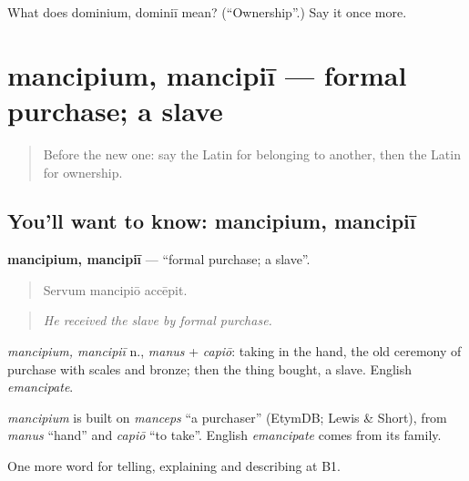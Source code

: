 \begin{tcolorbox}[breakable,colback=teal!4,colframe=teal!35!black,title={Before you move on}]
What does dominium, dominiī mean? (\textquotedblleft{}Ownership\textquotedblright{}.) Say it once more.
\end{tcolorbox}
\section[mancipium, mancipiī]{mancipium, mancipiī — formal purchase; a slave}

\label{lesson:LA-C417-mancipium}



\begin{quote}
Before the new one: say the Latin for belonging to another, then the Latin for ownership.
\end{quote}

\subsection*{You'll want to know: mancipium, mancipiī}
\textbf{mancipium, mancipiī} — \textquotedblleft{}formal purchase; a slave\textquotedblright{}.

\begin{quote}
Servum mancipiō accēpit.
\end{quote}

\begin{quote}
\emph{He received the slave by formal purchase.}
\end{quote}

\emph{mancipium, mancipiī} n., \emph{manus} + \emph{capiō}: taking in the hand, the old ceremony of purchase with scales and bronze; then the thing bought, a slave. English \emph{emancipate}.

\begin{cousinweb}
\emph{mancipium} is built on \emph{manceps} \textquotedblleft{}a purchaser\textquotedblright{} (EtymDB; Lewis \& Short), from \emph{manus} \textquotedblleft{}hand\textquotedblright{} and \emph{capiō} \textquotedblleft{}to take\textquotedblright{}. English \emph{emancipate} comes from its family.
\end{cousinweb}

\begin{grammarlens}[title={What you've built}]
One more word for telling, explaining and describing at B1.
\end{grammarlens}

